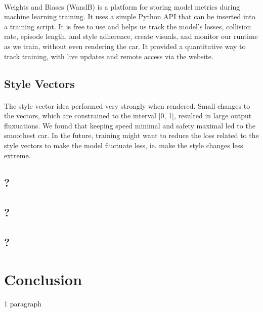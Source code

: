 \documentclass{article}
\begin{document}
\paragraph{}{}
Weights and Biases (WandB) is a platform for storing model metrics during
machine learning training. It uses a simple Python API that can be inserted
into a training script. It is free to use and helps us track the model's
losses, collision rate, episode length, and style adherence, create
visuals, and monitor our runtime as we train, without even rendering
the car. It provided a quantitative way to track training, with live
updates and remote access via the website. 
\subsection{Style Vectors}
\paragraph{}
The style vector idea performed very strongly when rendered. Small changes 
to the vectors, which are constrained to the interval [0, 1], resulted in large 
output fluxuations. We found that keeping speed minimal and safety maximal led
to the smoothest car. In the future, training might want to reduce the loss 
related to the style vectors to make the model fluctuate less, ie. make the 
style changes less extreme.
\subsection{?}
\subsection{?}
\subsection{?}

\section{Conclusion}

1 paragraph
\end{document}

